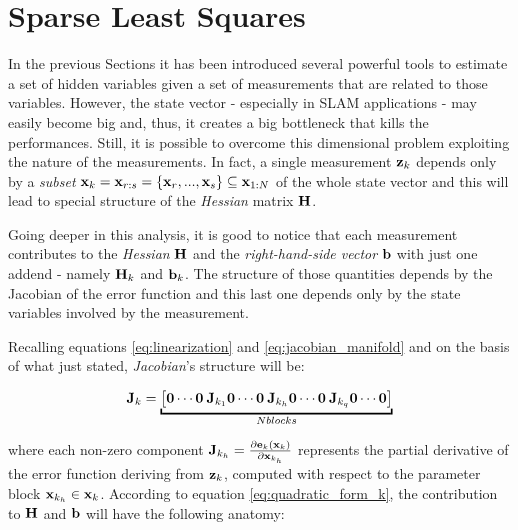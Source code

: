 \section{Sparse Least Squares}
In the previous Sections it has been introduced several powerful tools to estimate a set of hidden variables given a set of measurements that are related to those variables. However, the state vector - especially in SLAM applications - may easily become big and, thus, it creates a big bottleneck that kills the performances. Still, it is possible to overcome this dimensional problem exploiting the nature of the measurements. In fact, a single measurement $\mathbf{z}_k$ depends only by a \textit{subset} $\mathbf{x}_k = \mathbf{x}_{r:s} = \{\mathbf{x}_r, ..., \mathbf{x}_s\} \subseteq \mathbf{x}_{1:N} $ of the whole state vector and this will lead to special structure of the \textit{Hessian} matrix $\mathbf{H}$.

Going deeper in this analysis, it is good to notice that each measurement contributes to the \textit{Hessian} $\mathbf{H}$ and the \textit{right-hand-side vector} $\mathbf{b}$ with just one addend - namely $\mathbf{H}_k$ and $\mathbf{b}_k$. The structure of those quantities depends by the Jacobian of the error function and this last one depends only by the state variables involved by the measurement. 

Recalling equations \ref{eq:linearization} and \ref{eq:jacobian_manifold} and on the basis of what just stated, \textit{Jacobian}'s structure will be:

\begin{equation}
    \jacob_k = \underbracket{\left[\zero \cdots \zero \: \jacob_{k_1} \zero \cdots \zero \: \jacob_{k_h} \zero \cdots \zero \: \jacob_{k_q} \zero \cdots \zero\right]}_{N blocks}
    \label{eq:sparse_jacobian}
\end{equation}

\noindent where each non-zero component $\mathbf{J}_{k_h} = \frac{\partial \mathbf{e}_k(\mathbf{x}_k)}{\partial \mathbf{x}_{k_h}}$ represents the partial derivative of the error function deriving from $\mathbf{z}_k$, computed with respect to the parameter block $\mathbf{x}_{k_h} \in \mathbf{x}_k$. According to equation \ref{eq:quadratic_form_k}, the contribution to $\mathbf{H}$ and $\mathbf{b}$ will have the following anatomy:

